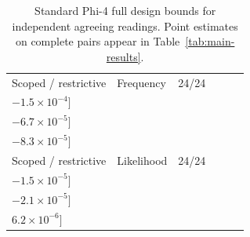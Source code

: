 \begin{table}[t]
{\begin{tabular*}{\textwidth}{@{\extracolsep{\fill}}llrlll@{}}
Scoped / restrictive & Frequency & 24/24 & \shortstack[l]{$[-1.5\times10^{-4},$\\$-1.5\times10^{-4}]$} & \shortstack[l]{$[-6.7\times10^{-5},$\\$-6.7\times10^{-5}]$} & \shortstack[l]{$[-8.3\times10^{-5},$\\$-8.3\times10^{-5}]$} \\
Scoped / restrictive & Likelihood & 24/24 & \shortstack[l]{$[-1.5\times10^{-5},$\\$-1.5\times10^{-5}]$} & \shortstack[l]{$[-2.1\times10^{-5},$\\$-2.1\times10^{-5}]$} & \shortstack[l]{$[6.2\times10^{-6},$\\$6.2\times10^{-6}]$} \\
\bottomrule
\end{tabular*}}
\caption{Standard Phi-4 full design bounds for independent agreeing readings. Point estimates on complete pairs appear in Table~\ref{tab:main-results}.}
\label{tab:review-static-bounds}
\end{table}
